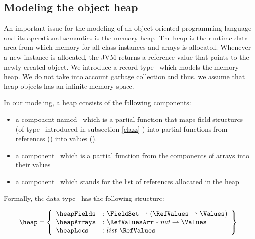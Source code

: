 \index{\HeapSet}
\index{\heap}
\index{\heapArrays}
\index{\heapArrays} 
\index{\heapTypeOf}

 \subsection{Modeling the object heap} \label{heap}
 An important issue for the modeling of an object oriented programming language and its operational semantics
 is the memory heap. The heap is the
 runtime data area from which memory  for all class instances and arrays is allocated. Whenever a new instance
 is allocated, the JVM returns a reference value that points to the newly created object. 
 We introduce a record type \HeapSet \ which models the memory heap. We do not take into account 
 garbage collection and thus, we assume that heap objects has an infinite memory space. 
 
 In our modeling, a heap consists of the following components:
 \begin{itemize}
       \item a component  named \heapFields \ which is a partial function that maps field
             structures (of type \FieldSet \ introduced in subsection \ref{clazz} ) into partial functions from references (\AllRefs)
	     into values (\Values).  
 

       \item  a component \heapArrays \ which is a partial function from the components of arrays  into their values

       \item  a component  \heapLocs  \ which stands for the  list of references allocated in the heap
              
 \end{itemize}


 Formally, the data type \HeapSet \ has the following structure:



  $$ \begin{array}{l}
         
         \heap = \left\{\begin{array}{ll}  \heapFields  &  : \FieldSet \rightharpoonup (  \RefValues \rightharpoonup \Values) \\
                                           \heapArrays  &  : \RefValuesArr * nat \rightharpoonup \Values \\
					   \heapLocs    &  : list \ \RefValues \\
                    \end{array} \right\}
   \end{array} $$


